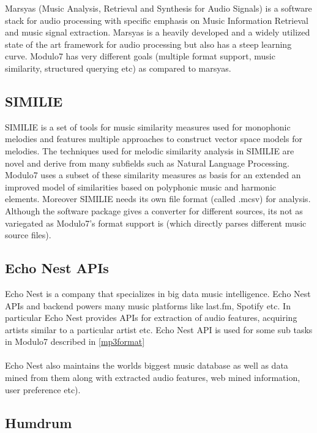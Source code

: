 \noindent Marsyas \cite{marsyas} (Music Analysis, Retrieval and Synthesis for Audio Signals) is a software stack for audio processing with specific emphasis on Music Information Retrieval and music signal extraction. Marsyas is a heavily developed and a widely utilized state of the art framework for audio processing but also has a steep learning curve. Modulo7 has very different goals (multiple format support, music similarity, structured querying etc) as compared to marsyas.

\subsection{SIMILIE}

\noindent SIMILIE \cite{similie} is a set of tools for music similarity measures used for monophonic melodies and features multiple approaches to construct vector space models for melodies. The techniques used for melodic similarity analysis in SIMILIE are novel and derive from many subfields such as Natural Language Processing. Modulo7 uses a subset of these similarity measures as basis for an extended an improved model of similarities based on polyphonic music and harmonic elements. Moreover SIMILIE needs its own file format (called .mcsv) for analysis. Although the software package gives a converter for different sources, its not as variegated as Modulo7's format support is (which directly parses different music source files).

\subsection{Echo Nest APIs}
 
\noindent Echo Nest \cite{echonestfingerprint} is a company that specializes in big data music intelligence. Echo Nest APIs and backend powers many music platforms like last.fm, Spotify etc. In particular Echo Nest provides APIs for extraction of audio features, acquiring artists similar to a particular artist etc. Echo Nest API is used for some sub tasks in Modulo7 described in \ref{mp3format} \\\\
Echo Nest also maintains the worlds biggest music database as well as data mined from them along with extracted audio features, web mined information, user preference etc). 

\subsection{Humdrum}

